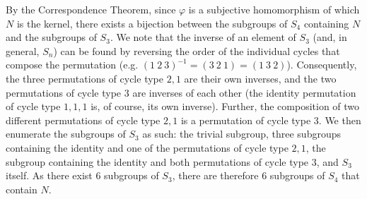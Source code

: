\documentclass{article}
\begin{document}
By the Correspondence Theorem, since $\varphi$ is a subjective homomorphism of which $N$ is the kernel, there exists a bijection between the subgroups of $S_4$ containing $N$ and the subgroups of $S_3$. We note that the inverse of an element of $S_3$ (and, in general, $S_n$) can be found by reversing the order of the individual cycles that compose the permutation (e.g. $\left(1~2~3\right)^{-1} = \left(3~2~1\right) = \left(1~3~2\right)$). Consequently, the three permutations of cycle type $2,1$ are their own inverses, and the two permutations of cycle type $3$ are inverses of each other (the identity permutation of cycle type $1,1,1$ is, of course, its own inverse). Further, the composition of two different permutations of cycle type $2,1$ is a permutation of cycle type $3$. We then enumerate the subgroups of $S_3$ as such: the trivial subgroup, three subgroups containing the identity and one of the permutations of cycle type $2,1$, the subgroup containing the identity and both permutations of cycle type $3$, and $S_3$ itself. As there exist $6$ subgroups of $S_3$, there are therefore $6$ subgroups of $S_4$ that contain $N$.
\end{document}
